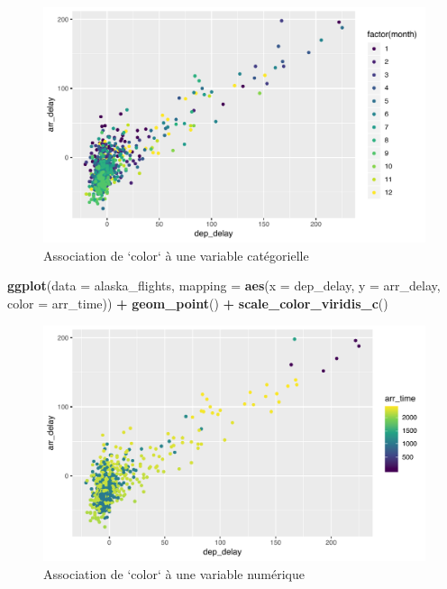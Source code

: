 \documentclass[a4paperpaper,]{article}
\newenvironment{Shaded}{\begin{snugshade}}{\end{snugshade}}
\newcommand{\KeywordTok}[1]{\textcolor[rgb]{0.13,0.29,0.53}{\textbf{#1}}}
\newcommand{\DataTypeTok}[1]{\textcolor[rgb]{0.13,0.29,0.53}{#1}}
\newcommand{\StringTok}[1]{\textcolor[rgb]{0.31,0.60,0.02}{#1}}
\newcommand{\OperatorTok}[1]{\textcolor[rgb]{0.81,0.36,0.00}{\textbf{#1}}}
\newcommand{\NormalTok}[1]{#1}
\theoremstyle{definition}
\theoremstyle{definition}
\theoremstyle{definition}
\theoremstyle{remark}
\begin{document}
\begin{figure}[htpb]

{\centering \includegraphics[width=0.9\linewidth]{figure/varcolorviridis-1} 

}

\caption{Association de `color` à une variable catégorielle}\label{fig:varcolorviridis}
\end{figure}

\begin{Shaded}
\begin{Highlighting}[]
\KeywordTok{ggplot}\NormalTok{(}\DataTypeTok{data =}\NormalTok{ alaska_flights, }\DataTypeTok{mapping =} \KeywordTok{aes}\NormalTok{(}\DataTypeTok{x =}\NormalTok{ dep_delay, }\DataTypeTok{y =}\NormalTok{ arr_delay, }\DataTypeTok{color =}\NormalTok{ arr_time)) }\OperatorTok{+}
\StringTok{  }\KeywordTok{geom_point}\NormalTok{() }\OperatorTok{+}
\StringTok{  }\KeywordTok{scale_color_viridis_c}\NormalTok{()}
\end{Highlighting}
\end{Shaded}

\begin{figure}[htpb]

{\centering \includegraphics[width=0.9\linewidth]{figure/varcolorviridis2-1} 

}

\caption{Association de `color` à une variable numérique}\label{fig:varcolorviridis2}
\end{figure}
\end{document}

